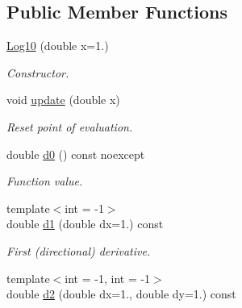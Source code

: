 \subsection*{Public Member Functions}
\begin{DoxyCompactItemize}
\item 
\hyperlink{structFunG_1_1CMath_1_1Log10_a4ff97c8e633503403322c218fcc11fbc}{Log10} (double x=1.)
\begin{DoxyCompactList}\small\item\em Constructor. \end{DoxyCompactList}\item 
\hypertarget{structFunG_1_1CMath_1_1Log10_a06e099560b36bb188afca0c265907bd1}{void \hyperlink{structFunG_1_1CMath_1_1Log10_a06e099560b36bb188afca0c265907bd1}{update} (double x)}\label{structFunG_1_1CMath_1_1Log10_a06e099560b36bb188afca0c265907bd1}

\begin{DoxyCompactList}\small\item\em Reset point of evaluation. \end{DoxyCompactList}\item 
\hypertarget{structFunG_1_1CMath_1_1Log10_a2aa6987873ab12e7f3368f6f3d51743c}{double \hyperlink{structFunG_1_1CMath_1_1Log10_a2aa6987873ab12e7f3368f6f3d51743c}{d0} () const noexcept}\label{structFunG_1_1CMath_1_1Log10_a2aa6987873ab12e7f3368f6f3d51743c}

\begin{DoxyCompactList}\small\item\em Function value. \end{DoxyCompactList}\item 
\hypertarget{structFunG_1_1CMath_1_1Log10_aad6455823446b7a3f943ff502861b2ba}{{\footnotesize template$<$int  = -\/1$>$ }\\double \hyperlink{structFunG_1_1CMath_1_1Log10_aad6455823446b7a3f943ff502861b2ba}{d1} (double dx=1.) const }\label{structFunG_1_1CMath_1_1Log10_aad6455823446b7a3f943ff502861b2ba}

\begin{DoxyCompactList}\small\item\em First (directional) derivative. \end{DoxyCompactList}\item 
\hypertarget{structFunG_1_1CMath_1_1Log10_a523477a0b4dc814989325f7271027f70}{{\footnotesize template$<$int  = -\/1, int  = -\/1$>$ }\\double \hyperlink{structFunG_1_1CMath_1_1Log10_a523477a0b4dc814989325f7271027f70}{d2} (double dx=1., double dy=1.) const }\label{structFunG_1_1CMath_1_1Log10_a523477a0b4dc814989325f7271027f70}


\end{DoxyCompactItemize}
